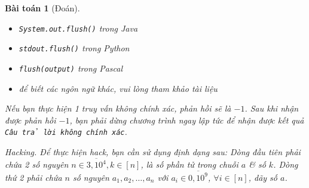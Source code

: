 \documentclass{article}
\newtheorem{baitoan}{Bài toán}
\begin{document}
\begin{baitoan}[Đoán]
\begin{itemize}
        \item {\tt System.out.flush()} trong Java
        \item {\tt stdout.flush()} trong Python
        \item {\tt flush(output)} trong Pascal
        \item để biết các ngôn ngữ khác, vui lòng tham khảo tài liệu
    \end{itemize}
    Nếu bạn thực hiện 1 truy vấn không chính xác, phản hồi sẽ là $-1$. Sau khi nhận được phản hồi $-1$, bạn phải dừng chương trình ngay lập tức để nhận được kết quả {\tt Câu trả lời không chính xác}.
    \item {\sf Hacking.} Để thực hiện hack, bạn cần sử dụng định dạng sau: Dòng đầu tiên phải chứa 2 số nguyên $n\in\overline{3,10^4},k\in[n]$, là số phần tử trong chuỗi $a$ \& số $k$. Dòng thứ 2 phải chứa $n$ số nguyên $a_1,a_2,\ldots,a_n$ với $a_i\in\overline{0,10^9}$, $\forall i\in[n]$, dãy số $a$.
\end{baitoan}
\end{document}

